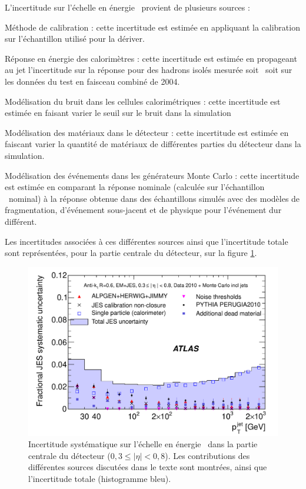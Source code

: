 L'incertitude sur l'\'echelle en \'energie \EMJES~provient de plusieurs sources :
\begin{maliste}
\item M\'ethode de calibration : cette incertitude est estim\'ee en appliquant la calibration sur l'\'echantillon utilis\'e pour la d\'eriver. 
\item R\'eponse en \'energie des calorim\`etres : cette incertitude est estim\'ee en propageant au jet l'incertitude sur la r\'eponse pour des hadrons isol\'es mesur\'ee soit \insitu~soit sur les donn\'ees du test en faisceau combin\'e de 2004.
\item Mod\'elisation du bruit dans les cellules calorim\'etriques : cette incertitude est estim\'ee en faisant varier le seuil sur le bruit dans la simulation
\item Mod\'elisation des mat\'eriaux dans le d\'etecteur : cette incertitude est estim\'ee en faiscant varier la quantit\'e de mat\'eriaux de diff\'erentes parties du d\'etecteur dans la simulation.
\item Mod\'elisation des \'ev\'enements dans les g\'en\'erateurs Monte Carlo : cette incertitude est estim\'ee en comparant la r\'eponse nominale (calcul\'ee sur l'\'echantillon \pythia~nominal) \`a la r\'eponse obtenue dans des \'echantillons simul\'es avec des mod\`eles de fragmentation, d'\'ev\'enement sous-jacent et de physique pour l'\'ev\'enement dur diff\'erent.
\end{maliste}

Les incertitudes associ\'ees \`a ces diff\'erentes sources ainsi que l'incertitude totale sont repr\'esent\'ees, pour la partie centrale du d\'etecteur, sur la figure \ref{fig:fig_22a_JES2010UncertaintyCentral}.

\begin{figure}[!h]
	\centering
	\includegraphics[scale=0.5]{figures/fig_22a_JES2010UncertaintyCentral.pdf}
	\caption{Incertitude syst\'ematique sur l'\'echelle en \'energie \EMJES~dans la partie centrale du d\'etecteur ($0,3\leq|\eta|<0,8$). Les contributions des diff\'erentes sources discut\'ees dans le texte sont montr\'ees, ainsi que l'incertitude totale (histogramme bleu).}
	\label{fig:fig_22a_JES2010UncertaintyCentral}
\end{figure}

